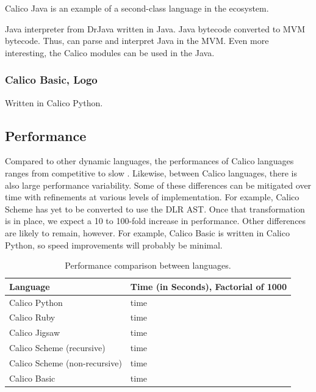 \documentclass[preprint]{sigplanconf}
\begin{document}
Calico Java is an example of a second-class language in the ecosystem.

Java interpreter from DrJava written in Java. Java bytecode converted
to MVM bytecode. Thus, can parse and interpret Java in the MVM. Even
more interesting, the Calico modules can be used in the Java.

\subsubsection{Calico Basic, Logo}

Written in Calico Python. 

\subsection{Performance}

Compared to other dynamic languages, the performances of Calico
languages ranges from competitive to slow
\cite{python-benchmark}. Likewise, between Calico languages, there is
also large performance variability. Some of these differences can be
mitigated over time with refinements at various levels of
implementation. For example, Calico Scheme has yet to be converted to
use the DLR AST. Once that transformation is in place, we expect a 10
to 100-fold increase in performance. Other differences are likely to
remain, however. For example, Calico Basic is written in Calico
Python, so speed improvements will probably be minimal.

\begin{table}[h]\footnotesize
  \centering
  \begin{tabular}{ l | l }
    \hline                        
    \textbf{Language} & \textbf{Time (in Seconds), Factorial of 1000} \\
    \hline                        
    Calico Python                 & time \\
    Calico Ruby                   & time \\
    Calico Jigsaw                 & time \\
    Calico Scheme (recursive)     & time \\
    Calico Scheme (non-recursive) & time \\
    Calico Basic                  & time \\
  \end{tabular}
  \caption{Performance comparison between languages.}
  \label{performance}
\end{table}
\end{document}
